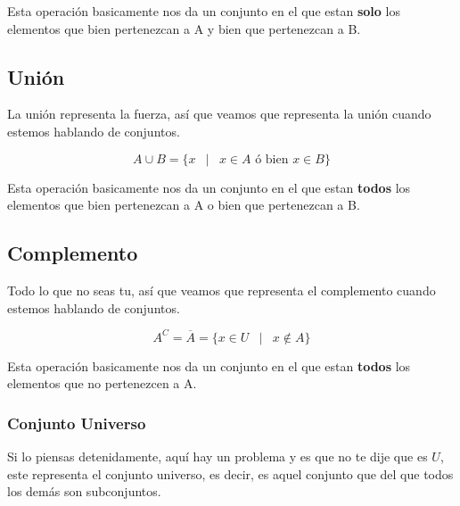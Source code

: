 \documentclass[12pt]{report}                                    %
\DeclareMathOperator \Space {\quad}                             %
\DeclareMathOperator \MiniSpace {\;}                            %
\newcommand \Such {\MiniSpace|\MiniSpace}                       %
\begin{document}
            Esta operación basicamente nos da un conjunto en el que estan \textbf{solo} los elementos
            que bien pertenezcan a A y bien que pertenezcan a B.


        \clearpage
        \subsection{Unión}

            La unión representa la fuerza, así que veamos que representa la unión cuando estemos
            hablando de conjuntos.

            \begin{equation}
                A \cup B = \{ x \Such x \in A \text{ ó bien } x \in B \}
            \end{equation}

            Esta operación basicamente nos da un conjunto en el que estan \textbf{todos} los elementos
            que bien pertenezcan a A o bien que pertenezcan a B.


        \clearpage
        \subsection{Complemento}

            Todo lo que no seas tu, así que veamos que representa el complemento cuando estemos
            hablando de conjuntos.

            \begin{equation}
                A^C = \overline A = \{ x \in U \Such x \notin A \}
            \end{equation}

            Esta operación basicamente nos da un conjunto en el que estan \textbf{todos} los elementos
            que no pertenezcen a A.

            \subsubsection{Conjunto Universo}
                Si lo piensas detenidamente, aquí hay un problema y es que no te dije que es $U$, este
                representa el conjunto universo, es decir, es aquel conjunto que del que todos los demás
                son subconjuntos.
\end{document}
